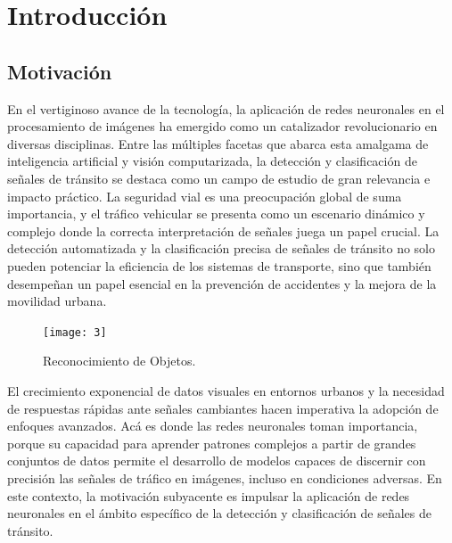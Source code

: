 \section{Introducción}
	\subsection{Motivación}
	En el vertiginoso avance de la tecnología, la aplicación de redes neuronales en el procesamiento de imágenes ha emergido como un catalizador revolucionario en diversas disciplinas. Entre las múltiples facetas que abarca esta amalgama de inteligencia artificial y visión computarizada, la detección y clasificación de señales de tránsito se destaca como un campo de estudio de gran relevancia e impacto práctico.
La seguridad vial es una preocupación global de suma importancia, y el tráfico vehicular se presenta como un escenario dinámico y complejo donde la correcta interpretación de señales juega un papel crucial. La detección automatizada y la clasificación precisa de señales de tránsito no solo pueden potenciar la eficiencia de los sistemas de transporte, sino que también desempeñan un papel esencial en la prevención de accidentes y la mejora de la movilidad urbana.
	\begin{figure}[ht]
		\centering
		\texttt{[image: 3]}
		\caption{Reconocimiento de Objetos.}
	\end{figure}
	
El crecimiento exponencial de datos visuales en entornos urbanos y la necesidad de respuestas rápidas ante señales cambiantes hacen imperativa la adopción de enfoques avanzados. Acá es donde las redes neuronales toman importancia, porque su capacidad para aprender patrones complejos a partir de grandes conjuntos de datos permite el desarrollo de modelos capaces de discernir con precisión las señales de tráfico en imágenes, incluso en condiciones adversas.
En este contexto, la motivación subyacente es impulsar la aplicación de redes neuronales en el ámbito específico de la detección y clasificación de señales de tránsito.

